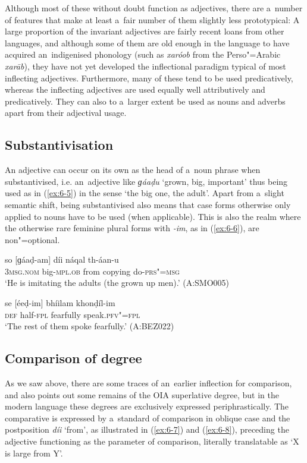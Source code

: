 Although most of these without doubt function as adjectives, there are a~number of features that make at least a~fair number of them slightly less prototypical: A large proportion of the invariant adjectives are fairly recent loans from other languages, and although some of them are old enough in the language to have acquired an~indigenised phonology (such as \textit{xaróob} from the Perso"=Arabic \textit{xarāb}), they have not yet developed the inflectional paradigm typical of most inflecting adjectives. Furthermore, many of these tend to be used predicatively, whereas the inflecting adjectives are used equally well attributively and predicatively. They can also to a~larger extent be used as nouns and adverbs apart from their adjectival usage.


\subsection{Substantivisation}
\label{subsec:6-3-2}

An adjective can occur on its own as the head of a~noun phrase when substantivised, i.e. an~adjective like \textit{ɡáaḍu} `grown, big, important' thus being used as in (\ref{ex:6-5}) in the sense `the big one, the adult'. Apart from a~slight semantic shift, being substantivised also means that case forms otherwise only applied to nouns have to be used (when applicable). This is also the realm where the otherwise rare feminine plural forms with \textit{-im}, as in (\ref{ex:6-6}), are non"=optional.

\begin{exe}
\ex
\label{ex:6-5}
\gll so [ɡáaḍ-am] díi náqal th-áan-u \\
\textsc{3msg.nom} big-\textsc{mpl.ob} from copying do-\textsc{prs"=msg} \\
\glt `He is imitating the adults (the grown up men).' (A:SMO005)

\ex
\label{ex:6-6}
\gll se [éeḍ-im] bhíilam khonḍíl-im \\
\textsc{def} half-\textsc{fpl} fearfully speak.\textsc{pfv"=fpl} \\
\glt `The rest of them spoke fearfully.' (A:BEZ022)
\end{exe}

\subsection{Comparison of degree}
\label{subsec:6-3-3}

As we saw above, there are some traces of an~earlier inflection for comparison, and \citet[17]{morgenstierne1941} also points out some remains of the OIA superlative degree, but in the modern language these degrees are exclusively expressed periphrastically. The comparative is expressed by a~standard of comparison in oblique case and the postposition \textit{díi} `from', as illustrated in (\ref{ex:6-7}) and (\ref{ex:6-8}), preceding the adjective functioning as the parameter of comparison, literally translatable as `X is large from Y'. 

